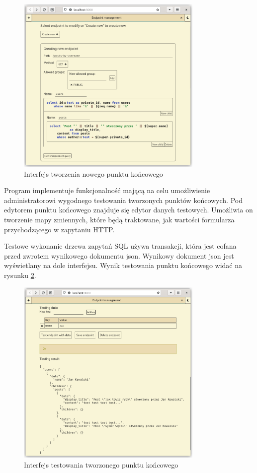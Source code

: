 \begin{figure}[h]
    \centering
    \includegraphics[width=0.8\textwidth]{./img/endpoint_creation.png}
    \caption{Interfejs tworzenia nowego punktu końcowego}
    \label{endpointCreationFigure}
\end{figure}

Program implementuje funkcjonalność mającą na celu umożliwienie administratorowi
wygodnego testowania tworzonych punktów końcowych. Pod edytorem punktu końcowego
znajduje się edytor danych testowych. Umożliwia on tworzenie mapy zmiennych,
które będą traktowane, jak wartości formularza przychodzącego w zapytaniu HTTP.

Testowe wykonanie drzewa zapytań SQL używa transakcji, która jest cofana przed
zwrotem wynikowego dokumentu json. Wynikowy dokument json jest wyświetlany na
dole interfejsu. Wynik testowania punktu końcowego widać na rysunku
\ref{endpointTestingFigure}.

\begin{figure}[h]
    \centering
    \includegraphics[width=0.8\textwidth]{./img/endpoint_testing.png}
    \caption{Interfejs testowania tworzonego punktu końcowego}
    \label{endpointTestingFigure}
\end{figure}

